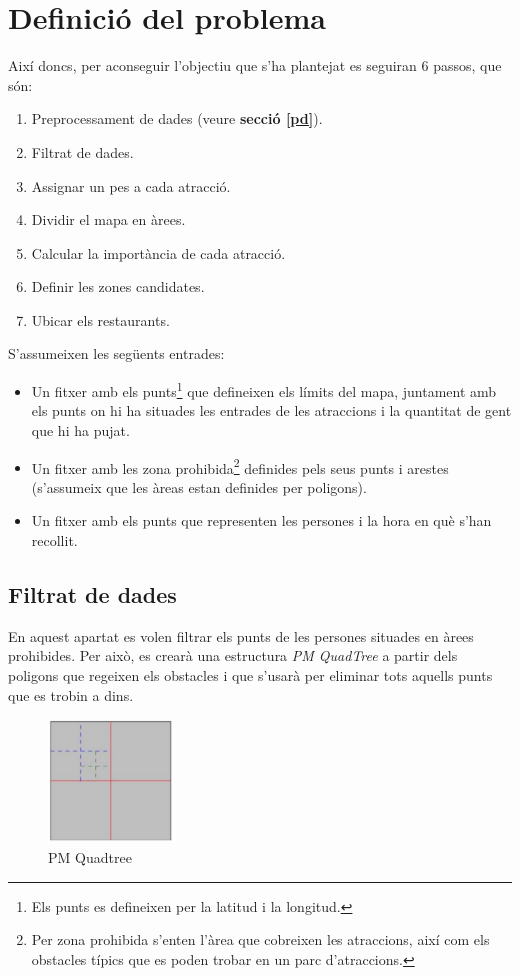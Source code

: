 \documentclass[12pt]{article}
\begin{document}
\clearpage
\section{Definició del problema}
Així doncs, per aconseguir l'objectiu que s'ha plantejat es seguiran 6 passos, que són:
\begin{enumerate}
	\item Preprocessament de dades (veure \textbf{secció \ref{pd}}).
	\item Filtrat de dades.
	\item Assignar un pes a cada atracció.
	\item Dividir el mapa en àrees.
	\item Calcular la importància de cada atracció.
	\item Definir les zones candidates.
	\item Ubicar els restaurants.
\end{enumerate}

S'assumeixen les següents entrades:
\begin{itemize}
	\item Un fitxer amb els punts\footnote{Els punts es defineixen per la latitud i la longitud.} que defineixen els límits del mapa, juntament amb els punts on hi ha situades les entrades de les atraccions i la quantitat de gent que hi ha pujat.
	\item Un fitxer amb les zona prohibida\footnote{Per zona prohibida s'enten l'àrea que cobreixen les atraccions, així com els obstacles típics que es poden trobar en un parc d'atraccions.} definides pels seus punts i arestes (s'assumeix que les àreas estan definides per poligons).
	\item Un fitxer amb els punts que representen les persones i la hora en què s'han recollit.
\end{itemize}

\subsection{Filtrat de dades}
En aquest apartat es volen filtrar els punts de les persones situades en àrees prohibides. Per això, es crearà una estructura \textit{PM QuadTree} a partir dels poligons que regeixen els obstacles i que s'usarà per eliminar tots aquells punts que es trobin a dins.

\begin{figure}[H]
	\centering
	\includegraphics[width=0.3\textwidth]{imatges/pm_quadtree.png}\par\vspace{1cm}
	\caption{PM Quadtree}
	\label{fig:pm_quadtree}
\end{figure}
\end{document}
